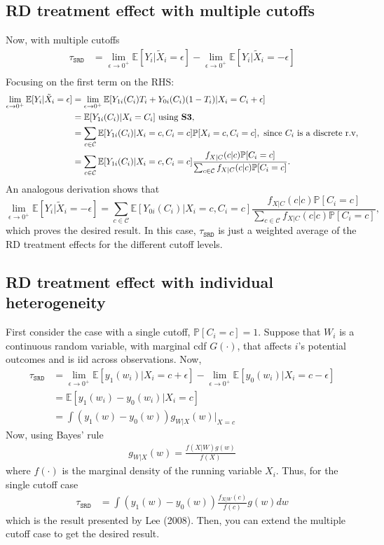 \documentclass[12pt]{article}
\newcommand{\E}{\mathbb{E}}
\newcommand{\Prob}{\mathbb{P}}
\newcommand{\e}{\epsilon}
\begin{document}
\subsection{RD treatment effect with multiple cutoffs}
Now, with multiple cutoffs
\begin{align*}
\tau_{\texttt{SRD}} &= \lim_{\e \to 0^+} \E[Y_i | \tilde{X}_i = \e] - \lim_{\e \to 0^+} \E[Y_i | \tilde{X}_i = -\e]\\
\end{align*}
Focusing on the first term on the RHS:
\begin{align*}
 \lim_{\e \to 0^+} \E[Y_i | \tilde{X}_i = \e]  &=   \lim_{\e \to 0^+} \E[Y_{1i}(C_i)T_i + Y_{0i}(C_i)(1-T_i)| X_i= C_i+ \e]\\
 &=\E[Y_{1i}(C_i)| X_i= C_i] \text{ using \textbf{S3}},\\
 &=\sum_{c\in \mathcal{C}}\E[Y_{1i}(C_i)| X_i=c, C_i = c]\Prob[X_i=c, C_i=c], \text{ since $C_i$ is a discrete r.v},\\
 &=\sum_{c\in \mathcal{C}}\E[Y_{1i}(C_i)| X_i=c, C_i = c] \frac{f_{X|C}(c|c)\Prob[C_i=c]}{\sum_{c\in \mathcal{C}}f_{X|C}(c|c)\Prob[C_i=c]}.
\end{align*}
An analogous derivation shows that $$\lim_{\e \to 0^+} \E[Y_i | \tilde{X}_i = -\e] = \sum_{c\in \mathcal{C}}\E[Y_{0i}(C_i)| X_i=c, C_i = c] \frac{f_{X|C}(c|c)\Prob[C_i=c]}{\sum_{c\in \mathcal{C}}f_{X|C}(c|c)\Prob[C_i=c]},$$ which proves the desired result. In this case, $\tau_{\texttt{SRD}}$ is just a weighted average of the RD treatment effects for the different cutoff levels. 

\subsection{RD treatment effect with individual heterogeneity}
First consider the case with a single cutoff, $\Prob[C_i=c]=1$. Suppose that $W_i$ is a continuous random variable, with marginal cdf $G(\cdot)$, that affects $i$'s potential outcomes and is iid across observations. Now,
\begin{align*}
\tau_{\texttt{SRD}} &= \lim_{\e \to 0^+} \E[y_{1}(w_i) | X_i=c+ \e] - \lim_{\e \to 0^+} \E[y_{0}(w_i)| X_i = c -\e]\\
&=\E[y_{1}(w_i) - y_{0}(w_i) | X_i=c]\\
&= \int (y_{1}(w) - y_{0}(w))g_{W|X}(w)|_{X=c}
\end{align*}
Now, using Bayes' rule
\begin{align*}
g_{W|X}(w) = \frac{f(X|W)g(w)}{f(X)}
\end{align*}
where $f(\cdot)$ is the marginal density of the running variable $X_i$. Thus, for the single cutoff case
\begin{align*}
\tau_{\texttt{SRD}} &= \int (y_{1}(w) - y_{0}(w)) \frac{f_{X|W}(c)}{f(c)}g(w)dw
\end{align*}
which is the result presented by Lee (2008). Then, you can extend the multiple cutoff case to get the desired result.
\end{document}
